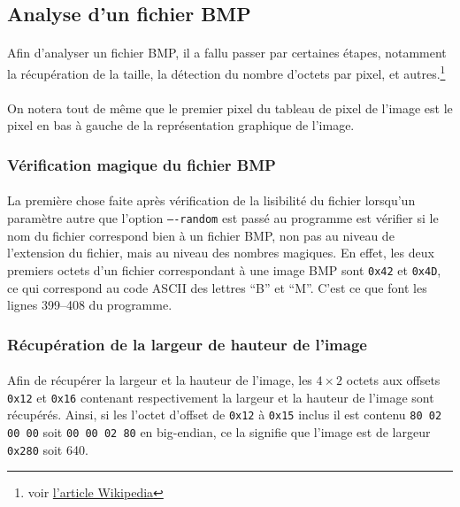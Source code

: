 \documentclass{report}
\begin{document}
\subsection{Analyse d'un fichier BMP}

\paragraph{} Afin d'analyser un fichier BMP, il a fallu passer par certaines
étapes, notamment la récupération de la taille, la détection du nombre d'octets
par pixel, et autres.\footnote{voir
\href{http://en.wikipedia.org/wiki/BMP_file_format}{l'article Wikipedia}}

\paragraph{} On notera tout de même que le premier pixel du tableau de pixel de
l'image est le pixel en bas à gauche de la représentation graphique de l'image.

\subsubsection{Vérification magique du fichier BMP}

\paragraph{} La première chose faite après vérification de la lisibilité du
fichier lorsqu'un paramètre autre que l'option \texttt{----random} est passé au
programme est vérifier si le nom du fichier correspond bien à un fichier BMP,
non pas au niveau de l'extension du fichier, mais au niveau des nombres
magiques. En effet, les deux premiers octets d'un fichier correspondant à une
image BMP sont \texttt{0x42} et \texttt{0x4D}, ce qui correspond au code ASCII
des lettres ``B'' et ``M''. C'est ce que font les lignes 399--408 du programme.

\subsubsection{Récupération de la largeur de hauteur de l'image}

\paragraph{} Afin de récupérer la largeur et la hauteur de l'image, les
$4\times2$ octets aux offsets \texttt{0x12} et \texttt{0x16} contenant
respectivement la largeur et la hauteur de l'image sont récupérés. Ainsi, si
les l'octet d'offset de \texttt{0x12} à \texttt{0x15} inclus il est contenu
\texttt{80 02 00 00} soit \texttt{00 00 02 80} en big-endian, ce la signifie
que l'image est de largeur \texttt{0x280} soit 640.
\end{document}
